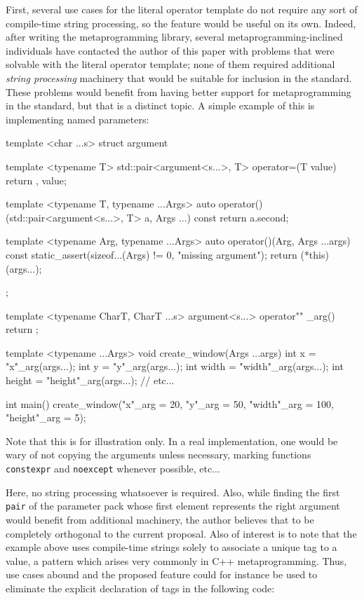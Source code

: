 \documentclass{wg21}
\newcommand{\cc}[1]{\texttt{#1}}
\begin{document}
First, several use cases for the literal operator template do not require any
sort of compile-time string processing, so the feature would be useful on its
own. Indeed, after writing the \cite{Boost.Hana} metaprogramming library,
several metaprogramming-inclined individuals have contacted the author of this
paper with problems that were solvable with the literal operator template; none
of them required additional \textit{string processing} machinery that would be
suitable for inclusion in the standard. These problems would benefit from
having better support for metaprogramming in the standard, but that is a
distinct topic. A simple example of this is implementing named parameters:

\begin{cpp}
template <char ...s>
struct argument {
  template <typename T>
  std::pair<argument<s...>, T> operator=(T value) {
    return {{}, value};
  }

  template <typename T, typename ...Args>
  auto operator()(std::pair<argument<s...>, T> a, Args ...) const {
    return a.second;
  }

  template <typename Arg, typename ...Args>
  auto operator()(Arg, Args ...args) const {
    static_assert(sizeof...(Args) != 0, "missing argument");
    return (*this)(args...);
  }
};

template <typename CharT, CharT ...s>
argument<s...> operator"" _arg() { return {}; }

template <typename ...Args>
void create_window(Args ...args) {
  int x = "x"_arg(args...);
  int y = "y"_arg(args...);
  int width = "width"_arg(args...);
  int height = "height"_arg(args...);
  // etc...
}

int main() {
  create_window("x"_arg = 20, "y"_arg = 50, "width"_arg = 100, "height"_arg = 5);
}
\end{cpp}

Note that this is for illustration only. In a real implementation, one would
be wary of not copying the arguments unless necessary, marking functions
\cc{constexpr} and \cc{noexcept} whenever possible, etc...

Here, no string processing whatsoever is required. Also, while finding the
first \cc{pair} of the parameter pack whose first element represents the right
argument would benefit from additional machinery, the author believes that to
be completely orthogonal to the current proposal. Also of interest is to note
that the example above uses compile-time strings solely to associate a unique
tag to a value, a pattern which arises very commonly in C++ metaprogramming.
Thus, use cases abound and the proposed feature could for instance be used to
eliminate the explicit declaration of tags in the following code:
\end{document}
